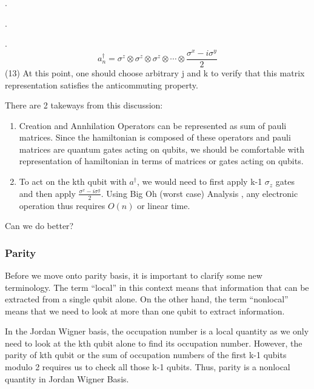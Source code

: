 \documentclass{article}
\begin{document}
    .

    .

    .
    \[a^{\dagger}_n = \sigma^{z}\otimes\sigma^{z}\otimes\sigma^{z}
    \otimes\cdots\otimes \frac{\sigma^{x} - i\sigma^{y} }{2}\]
    (13) At this point, one should choose arbitrary j and k to verify
    that this matrix representation satisfies the anticommuting property.

    There are 2 takeways from this discussion:
    \begin{enumerate}
      \item Creation and Annhilation Operators can be represented as sum of
      pauli matrices. Since the hamiltonian is composed of these operators
      and pauli matrices are quantum gates acting on qubits,
      we should be comfortable with representation of hamiltonian in terms of
      matrices or gates acting on qubits.
      \item To act on the kth qubit with \(a^{\dagger}\), we would need to
      first apply k-1 \(\sigma_z\) gates and then apply
      \(\frac{\sigma^{x} - i\sigma^{y} }{2}\). Using Big Oh (worst case) Analysis , any
      electronic operation thus requires \(O(n)\) or linear time.
    \end{enumerate}
      Can we do better?

    \subsubsection{Parity}
    Before we move onto parity basis, it is important to clarify some new
    terminology. The term ``local'' in this context means that information
    that can be extracted from a single qubit alone. On the other hand,
    the term ``nonlocal'' means that we need to look at more than one
    qubit to extract information.

    In the Jordan Wigner basis, the occupation number is a local quantity
    as we only need to look at the kth qubit alone to find its occupation
    number. However, the parity of kth qubit or the sum of occupation
    numbers of the first k-1 qubits modulo 2 requires us to check all those
    k-1 qubits. Thus, parity is a nonlocal quantity in Jordan Wigner Basis.
\end{document}
